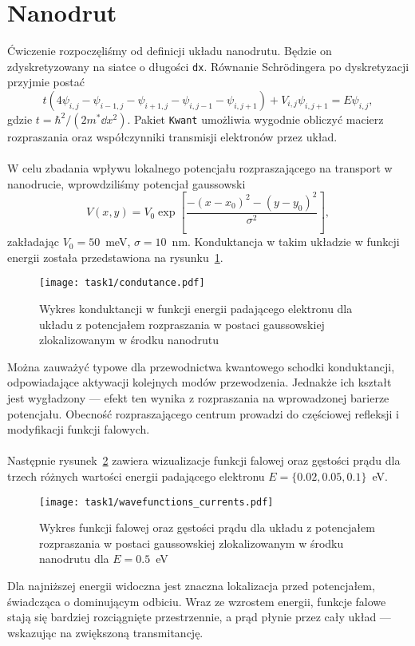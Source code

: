 \documentclass{article}
\begin{document}
\section{Nanodrut}
Ćwiczenie rozpoczęliśmy od definicji układu nanodrutu.
Będzie on zdyskretyzowany na siatce o długości \texttt{dx}.
Równanie Schr{\"o}dingera po dyskretyzacji przyjmie postać
\begin{equation}
    t(4\psi_{i,j} - \psi_{i-1,j} - \psi_{i+1,j} - \psi_{i,j-1} - \psi_{i,j+1})
    +
    V_{i,j}\psi_{i,j+1}
    =
    E\psi_{i,j},
\end{equation}
gdzie $t = \hbar^2/(2m^*\dd x^2)$.
Pakiet \texttt{Kwant} umożliwia wygodnie obliczyć macierz rozpraszania oraz współczynniki transmisji elektronów przez układ.\\
\\
W celu zbadania wpływu lokalnego potencjału rozpraszającego na transport w nanodrucie, wprowdziliśmy potencjał gaussowski
\begin{equation}
    V(x, y) = V_0\exp\left[\frac{-(x-x_0)^2 - (y-y_0)^2}{\sigma^2}\right],
\end{equation}
zakładając $V_0=50$~meV, $\sigma = 10$~nm.
Konduktancja w takim układzie w funkcji energii została przedstawiona na rysunku~\ref{fig:conductance-nanowire-ex1}.
\begin{figure}[htp!]
    \centering
    \texttt{[image: task1/condutance.pdf]}
    \caption{Wykres konduktancji w funkcji energii padającego elektronu dla układu z potencjałem rozpraszania w postaci gaussowskiej zlokalizowanym w środku nanodrutu}
    \label{fig:conductance-nanowire-ex1}
\end{figure}
Można zauważyć typowe dla przewodnictwa kwantowego schodki konduktancji, odpowiadające aktywacji kolejnych modów przewodzenia. Jednakże ich kształt jest wygładzony — efekt ten wynika z rozpraszania na wprowadzonej barierze potencjału. Obecność rozpraszającego centrum prowadzi do częściowej refleksji i modyfikacji funkcji falowych.\\
\\
Następnie rysunek~\ref{fig:task1-waavefunc} zawiera wizualizacje funkcji falowej oraz gęstości prądu dla trzech różnych wartości energii padającego elektronu $E = \{0.02, 0.05, 0.1\}$~eV.
\begin{figure}[htp!]
    \centering
    \texttt{[image: task1/wavefunctions\_currents.pdf]}
    \caption{Wykres funkcji falowej oraz gęstości prądu dla układu z potencjałem rozpraszania w postaci gaussowskiej zlokalizowanym w środku nanodrutu dla $E = 0.5$~eV}
    \label{fig:task1-waavefunc}
\end{figure}
 Dla najniższej energii widoczna jest znaczna lokalizacja przed potencjałem, świadcząca o dominującym odbiciu.
 Wraz ze wzrostem energii, funkcje falowe stają się bardziej rozciągnięte przestrzennie, a prąd płynie przez cały układ — wskazując na zwiększoną transmitancję.
 \newpage
\end{document}
